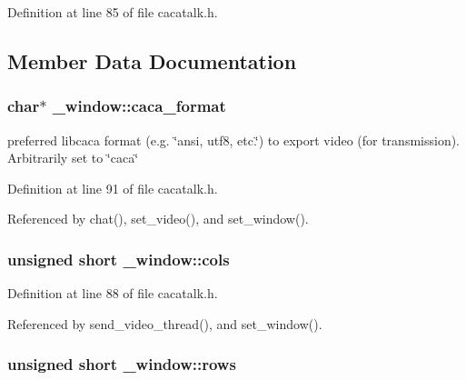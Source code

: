 \-Definition at line 85 of file cacatalk.\-h.



\subsection{\-Member \-Data \-Documentation}
\hypertarget{struct__window_a0fb378fdccd70a6f0d41c5150958def6}{
\subsubsection[{caca\-\_\-format}]{\setlength{\rightskip}{0pt plus 5cm}char$\ast$ {\bf \-\_\-window\-::caca\-\_\-format}}}\label{struct__window_a0fb378fdccd70a6f0d41c5150958def6}


preferred libcaca format (e.\-g. \char`\"{}ansi, utf8, etc.\char`\"{}) to export video (for transmission). \-Arbitrarily set to \char`\"{}caca\char`\"{} 



\-Definition at line 91 of file cacatalk.\-h.



\-Referenced by chat(), set\-\_\-video(), and set\-\_\-window().

\hypertarget{struct__window_a58d23390d6af61cfd5ee37d288278ca7}{
\subsubsection[{cols}]{\setlength{\rightskip}{0pt plus 5cm}unsigned short {\bf \-\_\-window\-::cols}}}\label{struct__window_a58d23390d6af61cfd5ee37d288278ca7}


\-Definition at line 88 of file cacatalk.\-h.



\-Referenced by send\-\_\-video\-\_\-thread(), and set\-\_\-window().

\hypertarget{struct__window_a59cb44669700308b223c28bd0abf45a2}{
\subsubsection[{rows}]{\setlength{\rightskip}{0pt plus 5cm}unsigned short {\bf \-\_\-window\-::rows}}}\label{struct__window_a59cb44669700308b223c28bd0abf45a2}


